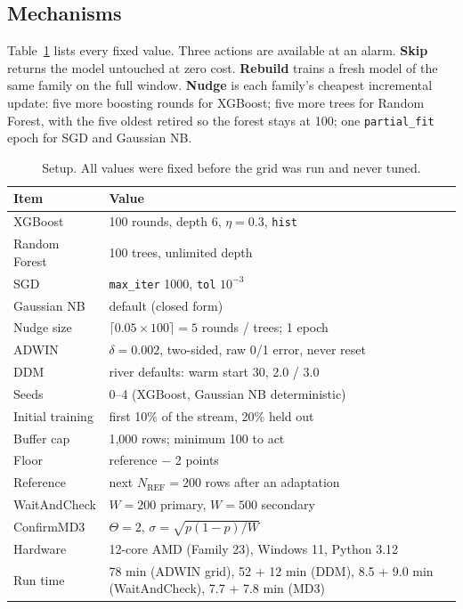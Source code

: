 \documentclass[conference]{IEEEtran}
\begin{document}
\subsection{Mechanisms}

Table~\ref{tab:setup} lists every fixed value. Three actions are available at an
alarm. \textbf{Skip} returns the model untouched at zero cost. \textbf{Rebuild}
trains a fresh model of the same family on the full window. \textbf{Nudge} is
each family's cheapest incremental update: five more boosting rounds for
XGBoost; five more trees for Random Forest, with the five oldest retired so the
forest stays at 100; one \texttt{partial\_fit} epoch for SGD and Gaussian NB.

\begin{table}[t]
\caption{Setup. All values were fixed before the grid was run and never tuned.}
\label{tab:setup}
\centering\footnotesize
\begin{tabular}{@{}lp{}@{}}
\toprule
Item & Value \\
\midrule
XGBoost & 100 rounds, depth 6, $\eta=0.3$, \texttt{hist} \\
Random Forest & 100 trees, unlimited depth \\
SGD & \texttt{max\_iter} 1000, \texttt{tol} $10^{-3}$ \\
Gaussian NB & default (closed form) \\
Nudge size & $\lceil 0.05\times100\rceil=5$ rounds / trees; 1 epoch \\
ADWIN & $\delta=0.002$, two-sided, raw 0/1 error, never reset \\
DDM & river defaults: warm start 30, $2.0$ / $3.0$ \\
Seeds & 0--4 (XGBoost, Gaussian NB deterministic) \\
Initial training & first 10\% of the stream, 20\% held out \\
Buffer cap & 1{,}000 rows; minimum 100 to act \\
Floor & reference $-$ 2 points \\
Reference & next $N_{\mathrm{REF}}=200$ rows after an adaptation \\
WaitAndCheck & $W=200$ primary, $W=500$ secondary \\
ConfirmMD3 & $\Theta=2$, $\sigma=\sqrt{p(1-p)/W}$ \\
Hardware & 12-core AMD (Family 23), Windows 11, Python 3.12 \\
Run time & 78 min (ADWIN grid), 52 + 12 min (DDM), 8.5 + 9.0 min
 (WaitAndCheck), 7.7 + 7.8 min (MD3) \\
\bottomrule
\end{tabular}
\end{table}
\end{document}
